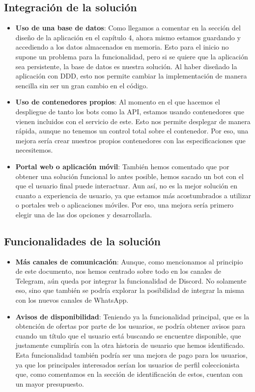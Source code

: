 \subsection{Integración de la solución}
\begin{itemize}
    \item \textbf{Uso de una base de datos}: Como llegamos a comentar en la sección 
    del diseño de la aplicación en el capítulo 4, ahora mismo estamos guardando y 
    accediendo a los datos almacenados en memoria. Esto para el inicio no supone un 
    problema para la funcionalidad, pero si se quiere que la aplicación sea 
    persistente, la base de datos es nuestra solución. Al haber diseñado la 
    aplicación con DDD, esto nos permite cambiar la implementación de manera 
    sencilla sin ser un gran cambio en el código.
    \item \textbf{Uso de contenedores propios}: Al momento en el que hacemos el 
    despliegue de tanto los bots como la API, estamos usando contenedores que 
    vienen incluidos con el servicio de este. Esto nos permite desplegar de manera 
    rápida, aunque no tenemos un control total sobre el contenedor. Por eso, una 
    mejora sería crear nuestros propios contenedores con las especificaciones que 
    necesitemos.
    \item \textbf{Portal web o aplicación móvil}: También hemos comentado que por 
    obtener una solución funcional lo antes posible, hemos sacado un bot con el que 
    el usuario final puede interactuar. Aun así, no es la mejor solución en cuanto 
    a experiencia de usuario, ya que estamos más acostumbrados a utilizar o 
    portales web o aplicaciones móviles. Por eso, una mejora sería primero elegir 
    una de las dos opciones y desarrollarla.
\end{itemize}

\subsection{Funcionalidades de la solución}
\begin{itemize}
    \item \textbf{Más canales de comunicación}: Aunque, como mencionamos al 
    principio de este documento, nos hemos centrado sobre todo en los canales de 
    Telegram, aún queda por integrar la funcionalidad de Discord. No solamente eso, 
    sino que también se podría explorar la posibilidad de integrar la misma con 
    los nuevos canales de WhatsApp.
    \item \textbf{Avisos de disponibilidad}: Teniendo ya la funcionalidad 
    principal, que es la obtención de ofertas por parte de los usuarios, se podría 
    obtener avisos para cuando un título que el usuario está buscando se encuentre 
    disponible, que justamente cumpliría con la otra historia de usuario que hemos 
    identificado. Esta funcionalidad también podría ser una mejora de pago para los 
    usuarios, ya que los principales interesados serían los usuarios de perfil 
    coleccionista que, como comentamos en la sección de identificación de estos, 
    cuentan con un mayor presupuesto.
\end{itemize}